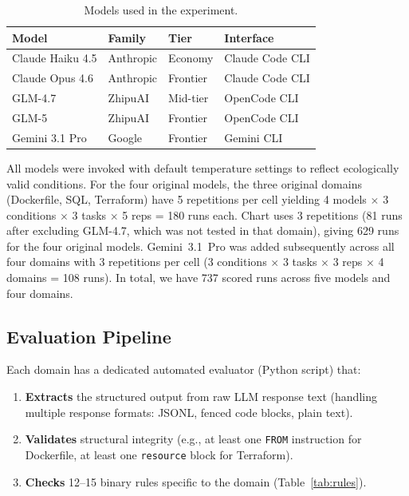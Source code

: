 \documentclass[sigconf,nonacm]{acmart}
\begin{document}
\begin{table}[t]
\caption{Models used in the experiment.}
\label{tab:models}
\centering\small
\begin{tabular}{llll}
\toprule
\textbf{Model} & \textbf{Family} & \textbf{Tier} & \textbf{Interface} \\
\midrule
Claude Haiku 4.5 & Anthropic & Economy & Claude Code CLI \\
Claude Opus 4.6 & Anthropic & Frontier & Claude Code CLI \\
GLM-4.7 & ZhipuAI & Mid-tier & OpenCode CLI \\
GLM-5 & ZhipuAI & Frontier & OpenCode CLI \\
Gemini 3.1 Pro & Google & Frontier & Gemini CLI \\
\bottomrule
\end{tabular}
\end{table}

All models were invoked with default temperature settings to reflect
ecologically valid conditions. For the four original models, the three original
domains (Dockerfile, SQL, Terraform) have 5 repetitions per cell yielding
4 models $\times$ 3 conditions $\times$ 3 tasks $\times$ 5 reps = 180 runs
each. Chart uses 3 repetitions (81 runs after excluding GLM-4.7, which was
not tested in that domain), giving 629 runs for the four original models.
Gemini~3.1~Pro was added subsequently across all four domains with 3
repetitions per cell (3 conditions $\times$ 3 tasks $\times$ 3 reps $\times$
4 domains = 108 runs). In total, we have 737 scored runs across five models
and four domains.

\subsection{Evaluation Pipeline}\label{sec:eval}

Each domain has a dedicated automated evaluator (Python script) that:

\begin{enumerate}
  \item \textbf{Extracts} the structured output from raw LLM response text
    (handling multiple response formats: JSONL, fenced code blocks, plain text).
  \item \textbf{Validates} structural integrity (e.g., at least one
    \texttt{FROM} instruction for Dockerfile, at least one \texttt{resource}
    block for Terraform).
  \item \textbf{Checks} 12--15 binary rules specific to the domain
    (Table~\ref{tab:rules}).
\end{enumerate}
\end{document}
